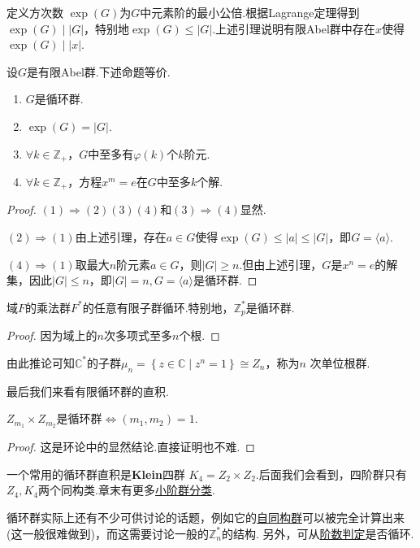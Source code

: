定义{\heiti 方次数} $\exp(G)$为$G$中元素阶的最小公倍.根据Lagrange定理得到$\exp(G)\mid|G|$，特别地$\exp(G)\le |G|$.上述引理说明有限Abel群中存在$x$使得$\exp(G)\mid|x|$.
\begin{thm}
	设$G$是有限Abel群.下述命题等价.
	\begin{enumerate}
		\item $G$是循环群.
		\item $\exp(G)=|G|$.
		\item $\forall k\in\mathbb{Z}_+$，$G$中至多有$\varphi(k)$个$k$阶元.
		\item $\forall k\in\mathbb{Z}_+$，方程$x^m=e$在$G$中至多$k$个解.
	\end{enumerate}
\end{thm}
\begin{proof}
	\hspace*{5.4pt}$(1)\Rightarrow(2)(3)(4)$和$(3)\Rightarrow(4)$显然.

	$(2)\Rightarrow(1)$由上述引理，存在$a\in G$使得$\exp(G)\le|a|\le|G|$，即$G=\langle a\rangle $.

	$(4)\Rightarrow(1)$取最大$n$阶元素$a\in G$，则$|G|\ge n$.但由上述引理，$G$是$x^n=e$的解集，因此$|G|\le n$，即$|G|=n,G=\langle a\rangle $是循环群.
\end{proof}
\begin{cor}
	域$F$的乘法群$F^*$的任意有限子群循环.特别地，$\mathbb{Z}_p^*$是循环群.
\end{cor}
\begin{proof}
	因为域上的$n$次多项式至多$n$个根.
\end{proof}

由此推论可知$\mathbb{C}^*$的子群$\mu_n=\left\{z\in\mathbb{C}\mid z^n=1\right\}\cong Z_n$，称为$n$ {\heiti 次单位根群}.

最后我们来看有限循环群的直积.
\begin{prop}
	$Z_{m_1}\times Z_{m_2}$是循环群$\Leftrightarrow(m_1,m_2)=1$.
\end{prop}
\begin{proof}
	这是环论中的显然结论.直接证明也不难.
\end{proof}

一个常用的循环群直积是{\heiti \textbf{Klein}四群} $K_4=Z_2\times Z_2$.后面我们会看到，四阶群只有$Z_4,K_4$两个同构类.章末有更多\hyperref[subsec:ClassificationSmallOrder]{小阶群分类}.

\begin{remark}
	循环群实际上还有不少可供讨论的话题，例如它的\hyperlink{prop:CyclicAuto}{自同构群}可以被完全计算出来(这一般很难做到)，而这需要讨论一般的$\mathbb{Z}_n^*$的结构.
	另外，可从\hyperlink{thm:CyclicFromOrder}{阶数判定}是否循环.
\end{remark}

